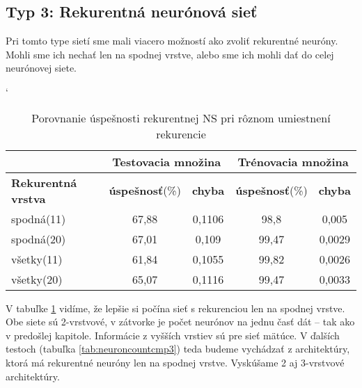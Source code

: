 \subsection{Typ 3: Rekurentná neurónová sieť}
Pri tomto type sietí sme mali viacero možností ako zvoliť rekurentné neuróny. Mohli sme ich nechať len na spodnej vrstve, alebo sme ich mohli dať do celej neurónovej siete.

\begin{table}[htp]
\catcode` %
\centering
\begin{tabular}{|l|c|c|c|c|}
\cline{2-5}
\multicolumn{1}{l}{} & \multicolumn{2}{|c|}{\textbf{Testovacia množina}} & \multicolumn{2}{c|}{\textbf{Trénovacia množina}} \\ 
\hline
\textbf{Rekurentná vrstva} & \textbf{úspešnosť}(\%) & \textbf{chyba} & \textbf{úspešnosť}(\%) & \textbf{chyba}  \\ \hline
spodná(11) &  67,88 & 0,1106 & 98,8 & 0,005  \\ \hline
spodná(20) & 67,01 & 0,109 & 99,47 & 0,0029  \\ \hline
všetky(11) & 61,84 & 0,1055 & 99,82 & 0,0026  \\ \hline
všetky(20) & 65,07 & 0,1116 & 99,47 & 0,0033  \\ \hline
\end{tabular}
\caption{Porovnanie úspešnosti rekurentnej NS pri rôznom umiestnení rekurencie}
\label{tab:reclayercmp}
\end{table}

V tabuľke \ref{tab:reclayercmp} vidíme, že lepšie si počína sieť s rekurenciou len na spodnej vrstve. Obe siete sú 2-vrstvové, v zátvorke je počet neurónov na jednu časť dát -- tak ako v predošlej kapitole. Informácie z vyšších vrstiev sú pre sieť mätúce. V ďalších testoch (tabuľka \ref{tab:neuroncountcmp3}) teda budeme vychádzať z architektúry, ktorá má rekurentné neuróny len na spodnej vrstve. Vyskúšame 2 aj 3-vrstvové architektúry.

